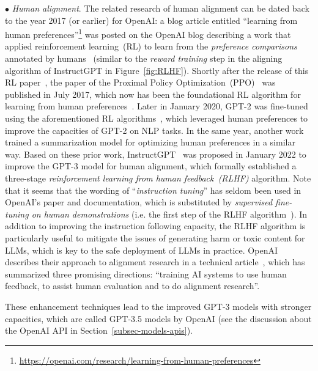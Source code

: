 $\bullet$ \emph{Human alignment}. The related research of human alignment can be dated back to the year 2017 (or earlier) for OpenAI: a blog article entitled ``learning from human preferences''\footnote{\url{https://openai.com/research/learning-from-human-preferences}} was posted on the OpenAI blog describing a work that applied   reinforcement learning~(RL) to learn from the \emph{preference comparisons}  annotated by  humans~\cite{Christiano-NeurIPS-2017-Deep} (similar to the \emph{reward training}  step in the aligning algorithm of InstructGPT in Figure~\ref{fig:RLHF}). 
Shortly after the release of this RL paper~\cite{Christiano-NeurIPS-2017-Deep}, the paper of the Proximal Policy Optimization~(PPO)~\cite{schulman-arxiv-2017-proximal} was published in July 2017, which now has been the foundational RL algorithm for learning from human preferences~\cite{Ouyang-arxiv-2022-Training}. Later in January 2020, GPT-2 was fine-tuned using the aforementioned RL algorithms~\cite{Christiano-NeurIPS-2017-Deep,schulman-arxiv-2017-proximal}, which leveraged human preferences to improve the capacities of GPT-2 on NLP tasks. In the same year, another work~\cite{Stiennon-arxiv-2020-learning} trained a summarization  model for optimizing  human preferences in a similar way. Based on these prior work, InstructGPT~\cite{Ouyang-arxiv-2022-Training} was proposed in January 2022 to improve the GPT-3 model for human alignment, which formally established a three-stage    \emph{reinforcement learning from human feedback~(RLHF)} algorithm. Note that it seems that the wording of ``\emph{instruction tuning}'' has seldom been used in OpenAI's paper and documentation, which is substituted by \emph{supervised fine-tuning on human demonstrations} (i.e. the first step of the RLHF algorithm~\cite{Ouyang-arxiv-2022-Training}). In addition to improving the instruction following capacity, the RLHF algorithm is particularly useful to mitigate the issues of generating harm or toxic content for LLMs, which is key to the safe deployment of LLMs in practice. OpenAI describes  their approach to alignment research in a technical article~\cite{OpenAI-blog-2022-alignment},  which has summarized three promising directions: ``training AI systems to use human feedback, to  assist human evaluation and to do  alignment research''.  

These enhancement techniques lead to the improved GPT-3 models with stronger capacities, which are called GPT-3.5 models  by OpenAI (see the discussion about the OpenAI API in Section~\ref{subsec-models-apis}).

